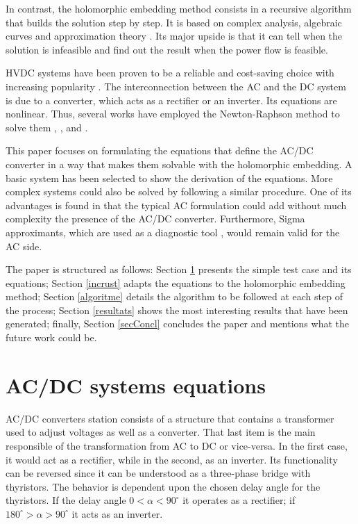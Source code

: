 \documentclass[conference]{IEEEtran}
\begin{document}
In contrast, the holomorphic embedding method consists in a recursive algorithm that builds the solution step by step. It is based on complex analysis, algebraic curves and approximation theory \cite{Trias2018}. Its major upside is that it can tell when the solution is infeasible and find out the result when the power flow is feasible.

HVDC systems have been proven to be a reliable and cost-saving choice \cite{Arrillaga1993} with increasing popularity \cite{Kothari}. The interconnection between the AC and the DC system is due to a converter, which acts as a rectifier or an inverter. Its equations are nonlinear. Thus, several works have employed the Newton-Raphson method to solve them \cite{Arrillaga1978}, \cite{Arrillaga1993}, \cite{Arrillaga1994} and \cite{Arrillaga2002}.

This paper focuses on formulating the equations that define the AC/DC converter in a way that makes them solvable with the holomorphic embedding. A basic system has been selected to show the derivation of the equations. More complex systems could also be solved by following a similar procedure. One of its advantages is found in that the typical AC formulation could add without much complexity the presence of the AC/DC converter. Furthermore, Sigma approximants, which are used as a diagnostic tool \cite{Trias2018}, would remain valid for the AC side.

The paper is structured as follows: Section \ref{equacions} presents the simple test case and its equations; Section \ref{incrust} adapts the equations to the holomorphic embedding method; Section \ref{algoritme} details the algorithm to be followed at each step of the process; Section \ref{resultats} shows the most interesting results that have been generated; finally, Section \ref{secConcl} concludes the paper and mentions what the future work could be. 

\section{AC/DC systems equations}\label{equacions}
AC/DC converters station consists of a structure that contains a transformer used to adjust voltages as well as a converter. That last item is the main responsible of the transformation from AC to DC or vice-versa. In the first case, it would act as a rectifier, while in the second, as an inverter. Its functionality can be reversed since it can be understood as a three-phase bridge with thyristors. The behavior is dependent upon the chosen delay angle for the thyristors. If the delay angle $0<\alpha<90^{\circ}$ it operates as a rectifier; if $180^{\circ}>\alpha>90^{\circ}$ it acts as an inverter.
\end{document}
